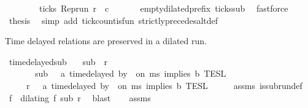 \begin{isabellebody}
\isanewline
\ \ \isamarkupfalse%
\ \isamarkupfalse%
\ {}\ \isamarkupfalse%
\ {\isacartoucheopen}{\isasymnot}ticks\ {\isacharparenleft}{\isacharparenleft}Rep{\isacharunderscore}run\ r{\isacharparenright}\ {}\ c\isanewline
\ \ \ \ \isamarkupfalse%
\ {\isacharasterisk}\ empty{\isacharunderscore}dilated{\isacharunderscore}prefix\ ticks{\isacharunderscore}sub\ \isamarkupfalse%
\ fastforce\isanewline
\ \ \isamarkupfalse%
\ \isamarkupfalse%
\ {\isacharquery}thesis\ \isamarkupfalse%
\ {\isacharparenleft}simp\ add{\isacharcolon}\ tick{\isacharunderscore}count{\isacharunderscore}is{\isacharunderscore}fun\ strictly{\isacharunderscore}precedes{\isacharunderscore}alt{\isacharunderscore}def{}{\isacharparenright}\ \isanewline
{}\isamarkupfalse%
%
\endisatagproof
{\isafoldproof}%
%
\isadelimproof
%
\endisadelimproof
%
\begin{isamarkuptext}%
Time delayed relations are preserved in a dilated run.%
\end{isamarkuptext}\isamarkuptrue%
\isamarkupfalse%
\ time{\isacharunderscore}delayed{\isacharunderscore}sub{\isacharcolon}\isanewline
\ \ \ {\isacartoucheopen}sub\ {\isasymlless}\ r{\isacartoucheclose}\isanewline
\ \ \ \ \ \ \ {\isacartoucheopen}sub\ {\isasymin}\ {\isasymlbrakk}\ a\ time{\isacharminus}delayed\ by\ {\isasymdelta}{\isasymtau}\ on\ ms\ implies\ b\ {\isasymrbrakk}\isactrlsub T\isactrlsub E\isactrlsub S\isactrlsub L{\isacartoucheclose}\isanewline
\ \ \ \ \ {\isacartoucheopen}r\ {\isasymin}\ {\isasymlbrakk}\ a\ time{\isacharminus}delayed\ by\ {\isasymdelta}{\isasymtau}\ on\ ms\ implies\ b\ {\isasymrbrakk}\isactrlsub T\isactrlsub E\isactrlsub S\isactrlsub L{\isacartoucheclose}\isanewline
%
\isadelimproof
%
\endisadelimproof
%
\isatagproof
{}\isamarkupfalse%
\ {\isacharminus}\isanewline
\ \ \isamarkupfalse%
\ assms{\isacharparenleft}{}{\isacharparenright}\ is{\isacharunderscore}subrun{\isacharunderscore}def\ \isamarkupfalse%
\ f\ \ {\isacharasterisk}{\isacharcolon}{\isacartoucheopen}dilating\ f\ sub\ r{\isacartoucheclose}\ \isamarkupfalse%
\ blast\isanewline
\ \ \isamarkupfalse%
\ assms{\isacharparenleft}{}{\isacharparenright}\ \isamarkupfalse%

\end{isabellebody}
